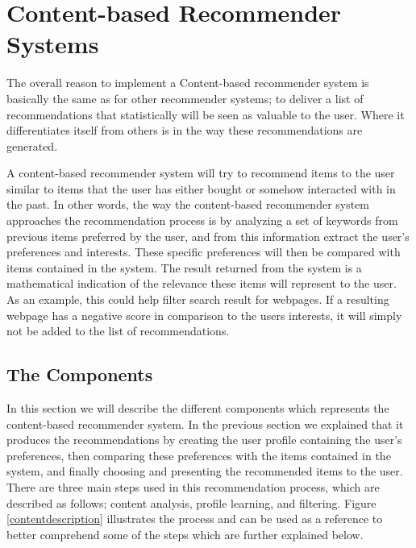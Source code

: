 \section{Content-based Recommender Systems}
\label{sec:content}
The overall reason to implement a Content-based recommender system is basically the same as for other recommender systems; to deliver a list of recommendations that statistically will be seen as valuable to the user. Where it differentiates itself from others is in the way these recommendations are generated.\newline 

A content-based recommender system will try to recommend items to the user similar to items that the user has either bought or somehow interacted with in the past. In other words, the way the content-based recommender system approaches the recommendation process is by analyzing a set of keywords from previous items preferred by the user, and from this information extract the user's preferences and interests.\newline 
These specific preferences will then be compared with items contained in the system. The result returned from the system is a mathematical indication of the relevance these items will represent to the user. As an example, this could help filter search result for webpages. If a resulting webpage has a negative score in comparison to the users interests, it will simply not be added to the list of recommendations.

\subsection{The Components}
In this section we will describe the different components which represents the content-based recommender system. In the previous section we explained that it produces the recommendations by creating the user profile containing the user's preferences, then comparing these preferences with the items contained in the system, and finally choosing and presenting the recommended items to the user. \newline
There are three main steps used in this recommendation process, which are described as follows; content analysis, profile learning, and filtering. Figure \ref{contentdescription} illustrates the process and can be used as a reference to better comprehend some of the steps which are further explained below.

